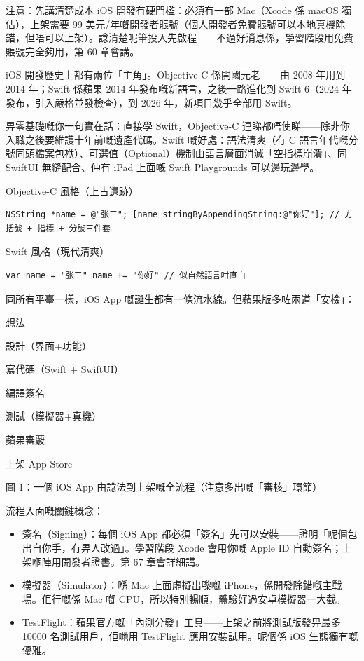 \begin{tcbwarn}{注意：先講清楚成本}
iOS 開發有硬門檻：必須有一部 Mac（Xcode 係 macOS 獨佔），上架需要 99 美元/年嘅開發者賬號（個人開發者免費賬號可以本地真機除錯，但唔可以上架）。諗清楚呢筆投入先啟程——不過好消息係，學習階段用免費賬號完全夠用，第 60 章會講。

\end{tcbwarn}


iOS 開發歷史上都有兩位「主角」。Objective-C 係開國元老——由 2008 年用到 2014 年；Swift 係蘋果 2014 年發布嘅新語言，之後一路進化到 Swift 6（2024 年發布，引入嚴格並發檢查），到 2026 年，新項目幾乎全部用 Swift。

畀零基礎嘅你一句實在話：直接學 Swift，Objective-C 連睇都唔使睇——除非你入職之後要維護十年前嘅遺產代碼。Swift 嘅好處：語法清爽（冇 C 語言年代嘅分號同頭檔案包袱）、可選值（Optional）機制由語言層面消滅「空指標崩潰」、同 SwiftUI 無縫配合、仲有 iPad 上面嘅 Swift Playgrounds 可以邊玩邊學。

Objective-C 風格（上古遺跡）

\begin{lstlisting}
NSString *name = @"张三"; [name stringByAppendingString:@"你好"]; // 方括號 + 指標 + 分號三件套
\end{lstlisting}

Swift 風格（現代清爽）

\begin{lstlisting}
var name = "张三" name += "你好" // 似自然語言咁直白
\end{lstlisting}


同所有平臺一樣，iOS App 嘅誕生都有一條流水線。但蘋果版多咗兩道「安檢」：

想法

設計（界面+功能）

寫代碼（Swift + SwiftUI）

編譯簽名

測試（模擬器+真機）

蘋果審覈

上架 App Store

\begin{center}\small\color{gray}圖 1：一個 iOS App 由諗法到上架嘅全流程（注意多出嘅「審核」環節）\end{center}

流程入面嘅關鍵概念：

\begin{itemize}
  \item 簽名（Signing）：每個 iOS App 都必須「簽名」先可以安裝——證明「呢個包出自你手，冇畀人改過」。學習階段 Xcode 會用你嘅 Apple ID 自動簽名；上架嗰陣用開發者證書。第 67 章會詳細講。
  \item 模擬器（Simulator）：喺 Mac 上面虛擬出嚟嘅 iPhone，係開發除錯嘅主戰場。佢行嘅係 Mac 嘅 CPU，所以特別暢順，體驗好過安卓模擬器一大截。
  \item TestFlight：蘋果官方嘅「內測分發」工具——上架之前將測試版發畀最多 10000 名測試用戶，佢哋用 TestFlight 應用安裝試用。呢個係 iOS 生態獨有嘅優雅。
\end{itemize}

